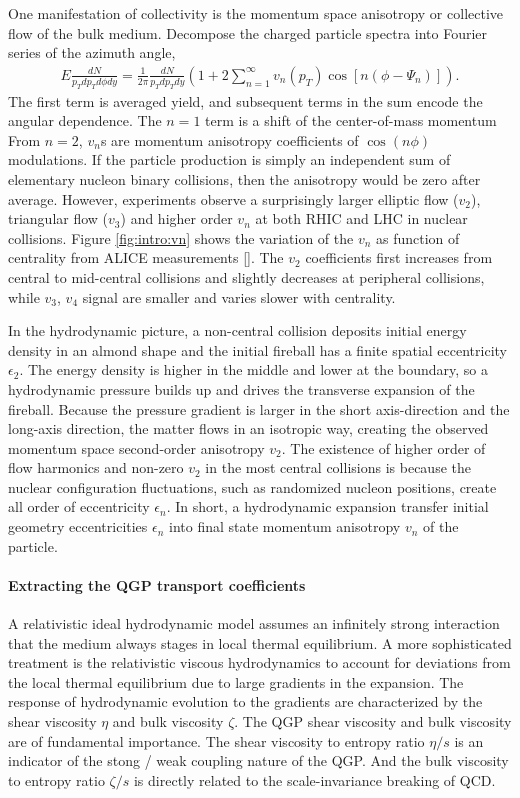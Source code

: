 One manifestation of collectivity is the momentum space anisotropy or collective flow of the bulk medium.
Decompose the charged particle spectra into Fourier series of the azimuth angle,
\begin{eqnarray}
E\frac{dN}{p_T dp_T d\phi dy} = \frac{1}{2\pi}\frac{dN}{p_T dp_T dy}\left(1 + 2\sum_{n=1}^{\infty}v_n(p_T)\cos\left[n(\phi-\Psi_n)\right]\right).
\end{eqnarray}
The first term is averaged yield, and subsequent terms in the sum encode the angular dependence. 
The $n=1$ term is a shift of the center-of-mass momentum
From $n=2$, $v_n$s are momentum anisotropy coefficients of $\cos({n\phi})$ modulations.
If the particle production is simply an independent sum of elementary nucleon binary collisions, then the anisotropy would be zero after average. 
However, experiments observe a surprisingly larger elliptic flow ($v_2$), triangular flow ($v_3$) and higher order $v_n$ at both RHIC and LHC in nuclear collisions.
Figure \ref{fig:intro:vn} shows the variation of the $v_n$ as function of centrality from ALICE measurements [].
The $v_2$ coefficients first increases from central to mid-central collisions and slightly decreases at peripheral collisions, while $v_3$, $v_4$ signal are smaller and varies slower with centrality.

In the hydrodynamic picture, a non-central collision deposits initial energy density in an almond shape and the initial fireball has a finite spatial eccentricity $\epsilon_2$.
The energy density is higher in the middle and lower at the boundary, so a hydrodynamic pressure builds up and drives the transverse expansion of the fireball.
Because the pressure gradient is larger in the short axis-direction and the long-axis direction, the matter flows in an isotropic way, creating the observed momentum space second-order anisotropy $v_2$.
The existence of higher order of flow harmonics and non-zero $v_2$ in the most central collisions is because the nuclear configuration fluctuations, such as randomized nucleon positions, create all order of eccentricity $\epsilon_n$.
In short, a hydrodynamic expansion transfer initial geometry eccentricities $\epsilon_n$ into final state momentum anisotropy $v_n$ of the particle.

\paragraph{Extracting the QGP transport coefficients}
A relativistic ideal hydrodynamic model assumes an infinitely strong interaction that the medium always stages in local thermal equilibrium.
A more sophisticated treatment is the relativistic viscous hydrodynamics to account for deviations from the local thermal equilibrium due to large gradients in the expansion.
The response of hydrodynamic evolution to the gradients are characterized by the shear viscosity $\eta$ and bulk viscosity $\zeta$.
The QGP shear viscosity and bulk viscosity are of fundamental importance. 
The shear viscosity to entropy ratio $\eta/s$ is an indicator of the stong / weak coupling nature of the QGP. 
And the bulk viscosity to entropy ratio $\zeta/s$ is directly related to  the scale-invariance breaking of QCD.


